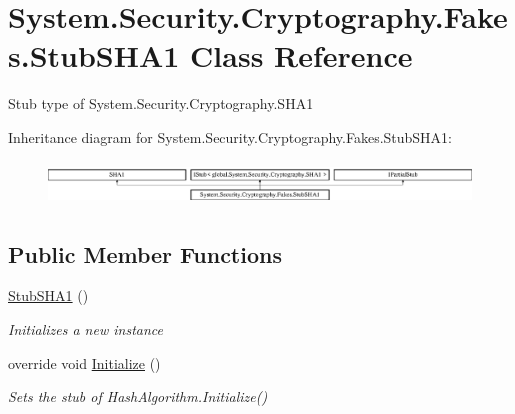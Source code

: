 \hypertarget{class_system_1_1_security_1_1_cryptography_1_1_fakes_1_1_stub_s_h_a1}{\section{System.\-Security.\-Cryptography.\-Fakes.\-Stub\-S\-H\-A1 Class Reference}
\label{class_system_1_1_security_1_1_cryptography_1_1_fakes_1_1_stub_s_h_a1}
}


Stub type of System.\-Security.\-Cryptography.\-S\-H\-A1 


Inheritance diagram for System.\-Security.\-Cryptography.\-Fakes.\-Stub\-S\-H\-A1\-:\begin{figure}[H]
\begin{center}
\leavevmode
\includegraphics[height=1.166667cm]{class_system_1_1_security_1_1_cryptography_1_1_fakes_1_1_stub_s_h_a1}
\end{center}
\end{figure}
\subsection*{Public Member Functions}
\begin{DoxyCompactItemize}
\item 
\hyperlink{class_system_1_1_security_1_1_cryptography_1_1_fakes_1_1_stub_s_h_a1_a973016b081e1b359d0771c0e6058bd50}{Stub\-S\-H\-A1} ()
\begin{DoxyCompactList}\small\item\em Initializes a new instance\end{DoxyCompactList}\item 
override void \hyperlink{class_system_1_1_security_1_1_cryptography_1_1_fakes_1_1_stub_s_h_a1_ac031a6771d2c63c10f5832fdbac54399}{Initialize} ()
\begin{DoxyCompactList}\small\item\em Sets the stub of Hash\-Algorithm.\-Initialize()\end{DoxyCompactList}\end{DoxyCompactItemize}
